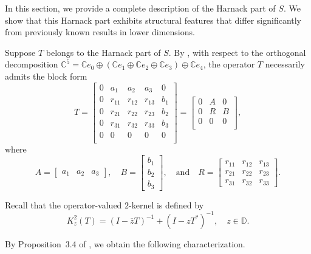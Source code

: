 \documentclass[12pt, reqno]{amsart}
\theoremstyle{definition}
\theoremstyle{remark}
\numberwithin{equation}{section}
\begin{document}
In this section, we provide a complete description of the Harnack part of $S$. We show that this Harnack part exhibits structural features that differ significantly from previously known results in lower dimensions.

Suppose $T$ belongs to the Harnack part of $S$. By \cite[Theorem~2.4]{CaNaBe2024}, with respect to the orthogonal decomposition $\mathbb{C}^{5}= \mathbb{C}e_0 \oplus (\mathbb{C}e_1 \oplus\mathbb{C}e_{2}\oplus\mathbb{C}e_3)\oplus\mathbb{C}e_4$, the operator $T$ necessarily admits the block form
\begin{equation}\label{form of T}
	T = \begin{bmatrix}
		0 & a_1 & a_2 & a_3 & 0 \\
		0 & r_{11} & r_{12} & r_{13} & b_1 \\
		0 & r_{21} & r_{22} & r_{23} & b_2 \\
		0 & r_{31} & r_{32} & r_{33} & b_3 \\
		0 & 0 & 0 & 0 & 0 \\
	\end{bmatrix} 
	= \begin{bmatrix}
		0 & A & 0 \\
		0 & R & B \\
		0 & 0 & 0 \\
	\end{bmatrix},
\end{equation} 
where 
\[
A = \begin{bmatrix} a_1 & a_2 & a_3 \end{bmatrix}, \quad 
B = \begin{bmatrix} b_1 \\ b_2 \\ b_3 \end{bmatrix}, \quad \text{and} \quad 
R = \begin{bmatrix} 
	r_{11} & r_{12} & r_{13} \\
	r_{21} & r_{22} & r_{23} \\ 
	r_{31} & r_{32} & r_{33} 
\end{bmatrix}.
\]

Recall that the operator-valued $2$-kernel is defined by
\begin{equation}\label{kernel-2}
	K_{z}^{2}(T) = (I-\overline{z}T)^{-1}+(I-zT^{*})^{-1}, \quad z\in \mathbb{D}.
\end{equation}

By Proposition~3.4 of \cite{CassierBenharrat2020}, we obtain the following characterization.
\end{document}
